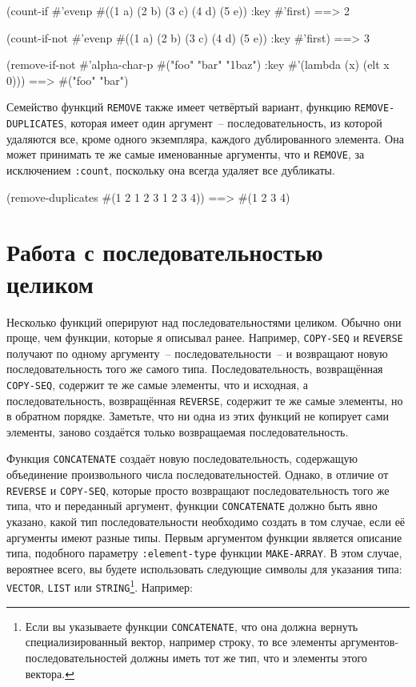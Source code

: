 \begin{myverb}
(count-if #'evenp #((1 a) (2 b) (3 c) (4 d) (5 e)) :key #'first)     ==> 2

(count-if-not #'evenp #((1 a) (2 b) (3 c) (4 d) (5 e)) :key #'first) ==> 3

(remove-if-not #'alpha-char-p
  #("foo" "bar" "1baz") :key #'(lambda (x) (elt x 0))) ==> #("foo" "bar")
\end{myverb}

Семейство функций \lstinline{REMOVE} также имеет четвёртый вариант, функцию
\lstinline{REMOVE-DUPLICATES}, которая имеет один аргумент~-- последовательность, из которой
удаляются все, кроме одного экземпляра, каждого дублированного элемента.  Она может
принимать те же самые именованные аргументы, что и \lstinline{REMOVE}, за исключением
\lstinline{:count}, поскольку она всегда удаляет все дубликаты.

\begin{myverb}
(remove-duplicates #(1 2 1 2 3 1 2 3 4)) ==> #(1 2 3 4)
\end{myverb}

\section{Работа с последовательностью целиком}

Несколько функций оперируют над последовательностями целиком.  Обычно
они проще, чем функции, которые я описывал ранее.  Например,
\lstinline{COPY-SEQ} и \lstinline{REVERSE} получают по одному аргументу~-- последовательности~-- и
возвращают новую последовательность того же самого типа.  Последовательность, возвращённая
\lstinline{COPY-SEQ}, содержит те же самые элементы, что и исходная,
а последовательность, возвращённая \lstinline{REVERSE}, содержит те же
самые элементы, но в обратном порядке.  Заметьте, что ни одна из этих функций не копирует
сами элементы, заново создаётся только возвращаемая последовательность.

Функция \lstinline{CONCATENATE} создаёт новую последовательность, содержащую объединение произвольного
числа последовательностей.  Однако, в отличие от \lstinline{REVERSE} и \lstinline{COPY-SEQ}, которые
просто возвращают последовательность того же типа, что и переданный аргумент, функции
\lstinline{CONCATENATE} должно быть явно указано, какой тип последовательности необходимо
создать в том случае, если её аргументы имеют разные типы.  Первым аргументом функции
является описание типа, подобного параметру \lstinline{:element-type} функции \lstinline{MAKE-ARRAY}.
В этом случае, вероятнее всего, вы будете использовать следующие символы для указания типа:
\lstinline{VECTOR}, \lstinline{LIST} или \lstinline{STRING}\footnote{Если вы указываете функции
  \lstinline{CONCATENATE}, что она должна вернуть специализированный вектор, например строку,
  то все элементы аргументов-последовательностей должны иметь тот же тип, что и элементы
  этого вектора.}.  Например:

